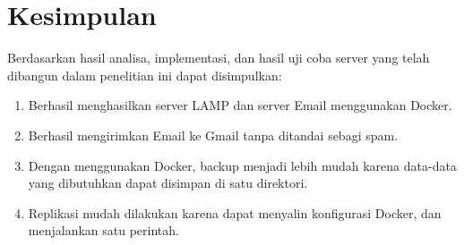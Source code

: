 \documentclass[./bab_5.tex]{subfiles}
\begin{document}
\section{Kesimpulan}
Berdasarkan hasil analisa, implementasi, dan hasil uji coba
server yang telah dibangun dalam penelitian ini dapat
disimpulkan:
\begin{enumerate}
  \item Berhasil menghasilkan server LAMP dan server Email
    menggunakan Docker.
  \item Berhasil mengirimkan Email ke Gmail tanpa ditandai
    sebagi spam.
  \item Dengan menggunakan Docker, backup menjadi lebih
    mudah karena data-data yang dibutuhkan dapat disimpan
    di satu direktori.
  \item Replikasi mudah dilakukan karena dapat menyalin
    konfigurasi Docker, dan menjalankan satu perintah.
\end{enumerate}
\end{document}
